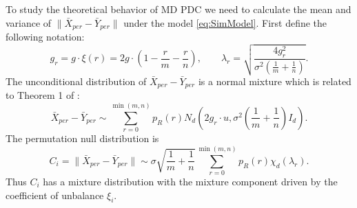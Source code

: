 \documentclass[12pt]{article}
\begin{document}
{To study the theoretical behavior of MD PDC we need to calculate
the mean and variance of $\|\bar X_{per}-\bar Y_{per}\|$ under the model \eqref{eq:SimModel}. First
define the following notation:
\begin{equation*}
g_r=g\cdot \xi(r)=2g\cdot (1-\frac{r}{m}-\frac{r}{n}),\qquad
\lambda_r=\sqrt{\frac{4g_r^2}{\sigma^2(\frac{1}{m}+\frac{1}{n})}}.
\end{equation*} 
The unconditional distribution of $\bar X_{per}- \bar Y_{per}$ is a normal mixture which is related to Theorem 1 of \citet{wei2016direction}:
\[
\bar X_{per}- \bar Y_{per} \sim \sum_{r=0}^{\min(m, n)}p_R(r)N_d(2g_r\cdot u, \sigma^2 (\frac{1}{m}+\frac{1}{n}) I_d).
\]
The permutation null distribution is
\begin{equation}
\label{eq:mixture}
C_i=\|\bar X_{per}-\bar Y_{per}\|\sim\sigma \sqrt{\frac{1}{m}+\frac{1}{n}}\sum_{r=0}^{\min(m, n)}p_R(r) \chi_d(\lambda_r).
\end{equation} 
Thus $C_i$ has a mixture distribution with the mixture component driven by the coefficient of unbalance $\xi_i$.
}
\end{document}
